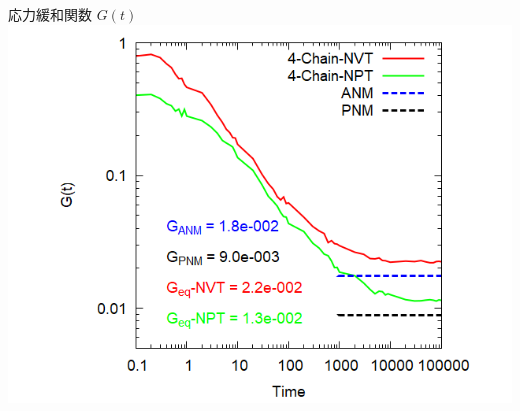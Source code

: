 \documentclass[12pt, dvipdfmx]{beamer}
\begin{document}
\begin{frame}
\begin{columns}[T, onlytextwidth]
\begin{block}{応力緩和関数 $G(t)$}
					\includegraphics[width=\textwidth]{gt_4chain_comp.png}
				\end{block}
		\end{columns}
\end{frame}
\end{document}
